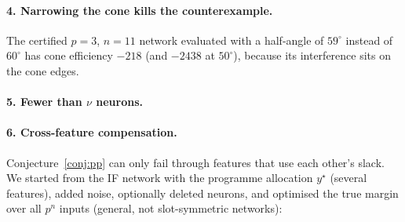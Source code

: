 \paragraph{4. Narrowing the cone kills the counterexample.}  The certified $p=3$, $n=11$ network evaluated with a
half-angle of $59^\circ$ instead of $60^\circ$ has cone efficiency $-218$ (and $-2438$ at $50^\circ$), because its
interference sits on the cone edges.

\paragraph{5. Fewer than $\nu$ neurons.}  

\paragraph{6. Cross-feature compensation.}  Conjecture~\ref{conj:pp} can only fail through features that use each
other's slack.  We started from the IF network with the programme allocation $y^\star$ (several features), added noise,
optionally deleted neurons, and optimised the true margin over all $p^n$ inputs (general, not slot-symmetric networks):

